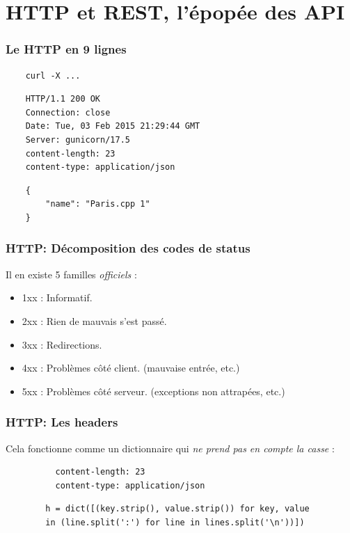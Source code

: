 \documentclass[10pt, compress]{beamer}
\begin{document}
\section{HTTP et REST, l'épopée des API}
\begin{frame}[fragile]
	\frametitle{Le HTTP en 9 lignes}
    \begin{verbatim}
    curl -X ...
    \end{verbatim}
    \pause
	\begin{verbatim}
    HTTP/1.1 200 OK
    Connection: close
    Date: Tue, 03 Feb 2015 21:29:44 GMT
    Server: gunicorn/17.5
    content-length: 23
    content-type: application/json
	\end{verbatim}
	\pause
	\begin{verbatim}
    {
        "name": "Paris.cpp 1"
    }
    \end{verbatim}
\end{frame}
\begin{frame}[fragile]
	\frametitle{HTTP: Décomposition des codes de status}
    
    Il en existe 5 familles \emph{officiels} :
    \pause
    \begin{itemize}[<+->]
    	\item 1xx : Informatif.
        \item 2xx : Rien de mauvais s'est passé.
        \item 3xx : Redirections.
        \item 4xx : Problèmes côté client. (mauvaise entrée, etc.)
        \item 5xx : Problèmes côté serveur. (exceptions non attrapées, etc.)
	\end{itemize}
\end{frame}
\begin{frame}[fragile]
	\frametitle{HTTP: Les headers}
    
    Cela fonctionne comme un dictionnaire qui \emph{ne prend pas en compte la casse} :
    \pause
    \begin{center}
          \begin{verbatim}
          content-length: 23
          content-type: application/json
          \end{verbatim}
    \end{center}
    \pause
    \begin{verbatim}
        h = dict([(key.strip(), value.strip()) for key, value
        in (line.split(':') for line in lines.split('\n'))])
    \end{verbatim}
\end{frame}
\end{document}
